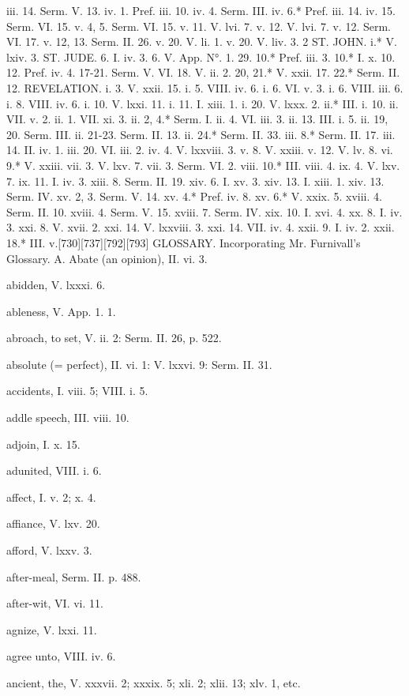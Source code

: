 iii. 14.	Serm. V. 13.
iv. 1.	Pref. iii. 10.
iv. 4.	Serm. III.
iv. 6.*	Pref. iii. 14.
iv. 15.	Serm. VI. 15.
v. 4, 5.	Serm. VI. 15.
v. 11.	V. lvi. 7.
v. 12.	V. lvi. 7.
v. 12.	Serm. VI. 17.
v. 12, 13.	Serm. II. 26.
v. 20.	V. li. 1.
v. 20.	V. liv. 3.
2 ST. JOHN.
i.*	V. lxiv. 3.
ST. JUDE.
6.	I. iv. 3.
6.	V. App. N°. 1. 29.
10.*	Pref. iii. 3.
10.*	I. x. 10.
12.	Pref. iv. 4.
17-21.	Serm. V. VI.
18.	V. ii. 2.
20, 21.*	V. xxii. 17.
22.*	Serm. II. 12.
REVELATION.
i. 3.	V. xxii. 15.
i. 5.	VIII. iv. 6.
i. 6.	VI. v. 3.
i. 6.	VIII. iii. 6.
i. 8.	VIII. iv. 6.
i. 10.	V. lxxi. 11.
i. 11.	I. xiii. 1.
i. 20.	V. lxxx. 2.
ii.*	III. i. 10.
ii.	VII. v. 2.
ii. 1.	VII. xi. 3.
ii. 2, 4.*	Serm. I.
ii. 4.	VI. iii. 3.
ii. 13.	III. i. 5.
ii. 19, 20.	Serm. III.
ii. 21-23.	Serm. II. 13.
ii. 24.*	Serm. II. 33.
iii. 8.*	Serm. II. 17.
iii. 14.	II. iv. 1.
iii. 20.	VI. iii. 2.
iv. 4.	V. lxxviii. 3.
v. 8.	V. xxiii.
v. 12.	V. lv. 8.
vi. 9.*	V. xxiii.
vii. 3.	V. lxv. 7.
vii. 3.	Serm. VI. 2.
viii. 10.*	III. viii. 4.
ix. 4.	V. lxv. 7.
ix. 11.	I. iv. 3.
xiii. 8.	Serm. II. 19.
xiv. 6.	I. xv. 3.
xiv. 13.	I. xiii. 1.
xiv. 13.	Serm. IV.
xv. 2, 3.	Serm. V. 14.
xv. 4.*	Pref. iv. 8.
xv. 6.*	V. xxix. 5.
xviii. 4.	Serm. II. 10.
xviii. 4.	Serm. V. 15.
xviii. 7.	Serm. IV.
xix. 10.	I. xvi. 4.
xx. 8.	I. iv. 3.
xxi. 8.	V. xvii. 2.
xxi. 14.	V. lxxviii. 3.
xxi. 14.	VII. iv. 4.
xxii. 9.	I. iv. 2.
xxii. 18.*	III. v.[730][737][792][793]
GLOSSARY. 
Incorporating Mr. Furnivall’s Glossary.
A.
Abate (an opinion), II. vi. 3.

abidden, V. lxxxi. 6.

ableness, V. App. 1. 1.

abroach, to set, V. ii. 2: Serm. II. 26, p. 522.

absolute (= perfect), II. vi. 1: V. lxxvi. 9: Serm. II. 31.

accidents, I. viii. 5; VIII. i. 5.

addle speech, III. viii. 10.

adjoin, I. x. 15.

adunited, VIII. i. 6.

affect, I. v. 2; x. 4.

affiance, V. lxv. 20.

afford, V. lxxv. 3.

after-meal, Serm. II. p. 488.

after-wit, VI. vi. 11.

agnize, V. lxxi. 11.

agree unto, VIII. iv. 6.

ancient, the, V. xxxvii. 2; xxxix. 5; xli. 2; xlii. 13; xlv. 1, etc.

